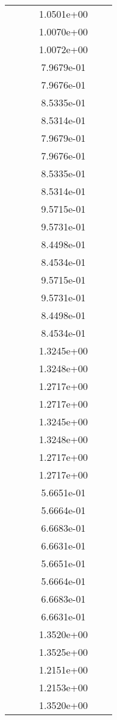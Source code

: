 \begin{xltabular}{\textwidth}{r|rS[table-format=1.3e+2]S[table-format=1.4e+2]S[table-format=1.4e+2]S[table-format=-1.5]}
&  &  & 1.0501e+00 & & \\
&  &  & 1.0070e+00 & & \\
&  &  & 1.0072e+00 & & \\
&  &  & 7.9679e-01 & & \\
&  &  & 7.9676e-01 & & \\
&  &  & 8.5335e-01 & & \\
&  &  & 8.5314e-01 & & \\
&  &  & 7.9679e-01 & & \\
&  &  & 7.9676e-01 & & \\
&  &  & 8.5335e-01 & & \\
&  &  & 8.5314e-01 & & \\
&  &  & 9.5715e-01 & & \\
&  &  & 9.5731e-01 & & \\
&  &  & 8.4498e-01 & & \\
&  &  & 8.4534e-01 & & \\
&  &  & 9.5715e-01 & & \\
&  &  & 9.5731e-01 & & \\
&  &  & 8.4498e-01 & & \\
&  &  & 8.4534e-01 & & \\
&  &  & 1.3245e+00 & & \\
&  &  & 1.3248e+00 & & \\
&  &  & 1.2717e+00 & & \\
&  &  & 1.2717e+00 & & \\
&  &  & 1.3245e+00 & & \\
&  &  & 1.3248e+00 & & \\
&  &  & 1.2717e+00 & & \\
&  &  & 1.2717e+00 & & \\
&  &  & 5.6651e-01 & & \\
&  &  & 5.6664e-01 & & \\
&  &  & 6.6683e-01 & & \\
&  &  & 6.6631e-01 & & \\
&  &  & 5.6651e-01 & & \\
&  &  & 5.6664e-01 & & \\
&  &  & 6.6683e-01 & & \\
&  &  & 6.6631e-01 & & \\
&  &  & 1.3520e+00 & & \\
&  &  & 1.3525e+00 & & \\
&  &  & 1.2151e+00 & & \\
&  &  & 1.2153e+00 & & \\
&  &  & 1.3520e+00 & & \\

\end{xltabular}
